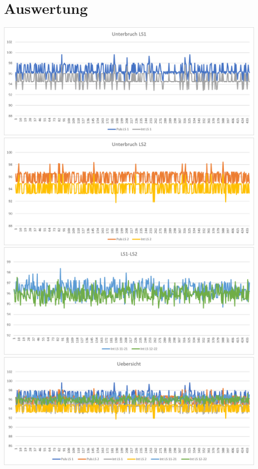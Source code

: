 \section{Auswertung}\label{app:Auswertung}
\includegraphics[width=\textwidth]{images/auswertungLS1.png}\\
\includegraphics[width=\textwidth]{images/auswertungLS2.png}\\
\includegraphics[width=\textwidth]{images/auswertungLS1LS2.png}\\
\includegraphics[width=\textwidth]{images/auswertungInt.png}\\\

